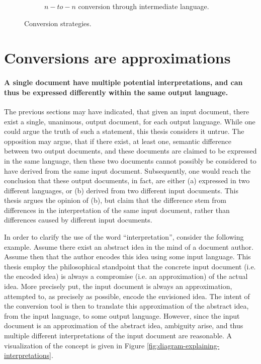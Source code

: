 \documentclass{scrreprt}
\begin{document}
\begin{figure}[h]
\begin{subfigure}{.5\textwidth}

    \caption{$n-to-n$ conversion through intermediate language.}
    \label{fig:n-to-n-conversion-boxes-with-intermediate-format}
  \end{subfigure}
  
  \label{fig:n-to-n-conversion-boxes}
  \caption{Conversion strategies.}
\end{figure}




\section{Conversions are approximations}
\paragraph{A single document have multiple potential interpretations, and can thus be expressed differently within the same output language.} The previous sections may have indicated, that given an input document, there exist a single, unanimous, output document, for each output language. While one could argue the truth of such a statement, this thesis considers it untrue.  The opposition may argue, that if there exist, at least one, semantic difference between two output documents, and these documents are claimed to be expressed in the same language, then these two documents cannot possibly be considered to have derived from the same input document. Subsequently, one would reach the conclusion that these output documents, in fact, are either (a) expressed in two different languages, or (b) derived from two different input documents. This thesis argues the opinion of (b), but claim that the difference stem from differences in the interpretation of the same input document, rather than differences caused by different input documents.

In order to clarify the use of the word ``interpretation'', consider the following example. Assume there exist an abstract idea in the mind of a document author. Assume then that the author encodes this idea using some input language. This thesis employ the philosophical standpoint that the concrete input document (i.e. the encoded idea) is always a compromise (i.e. an approximation) of the actual idea. More precisely put, the input document is always an approximation, attempted to, as precisely as possible, encode the envisioned idea. The intent of the conversion tool is then to translate this approximation of the abstract idea, from the input language, to some output language.  However, since the input document is an approximation of the abstract idea, ambiguity arise, and thus multiple different interpretations of the input document are reasonable. A visualization of the concept is given in Figure \ref{fig:diagram-explaining-interpretations}.
\end{document}
